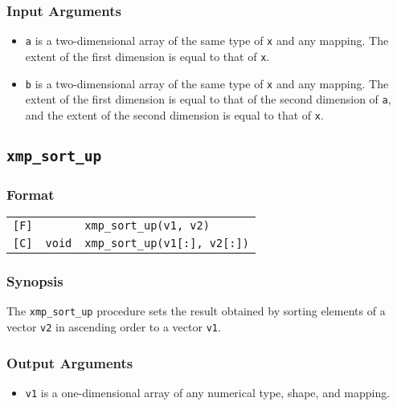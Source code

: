 \subsubsection*{Input Arguments}
\begin{itemize}
 \item {\tt a} is a two-dimensional array of the same type of {\tt x}
       and any mapping. The extent of the first dimension is equal to
       that of {\tt x}.
 \item {\tt b} is a two-dimensional array of the same type of {\tt x}
       and any mapping. The extent of the first dimension is equal to
       that of the second dimension of {\tt a}, and the extent of the
       second dimension is equal to that of {\tt x}.
\end{itemize}


\subsection{\tt xmp\_sort\_up}

\subsubsection*{Format}

\begin{tabular}{lll}

\verb![F]!&            & {\tt xmp\_sort\_up(v1, v2)}\\

\verb![C]!& {\tt void} & {\tt xmp\_sort\_up(v1[:], v2[:])}\\

\end{tabular}

\subsubsection*{Synopsis}

The {\tt xmp\_sort\_up} procedure sets the result obtained by sorting
elements of a vector {\tt v2} in ascending order to a vector {\tt v1}.

\subsubsection*{Output Arguments}
\begin{itemize}
 \item {\tt v1} is a one-dimensional array of any numerical type,
       shape, and mapping.
\end{itemize}

